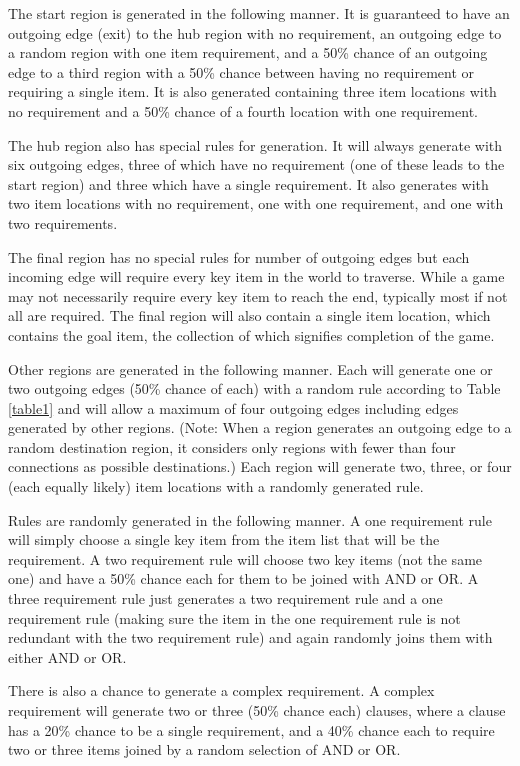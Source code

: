 \documentclass{ieeeaccess}
\begin{document}
The start region is generated in the following manner. It is guaranteed to have an outgoing
edge (exit) to the hub region with no requirement, an outgoing edge to a random region with one
item requirement, and a 50\% chance of an outgoing edge to a third region with a 50\% chance
between having no requirement or requiring a single item. It is also generated containing three
item locations with no requirement and a 50\% chance of a fourth location with one requirement.

The hub region also has special rules for generation. It will always generate with six outgoing
edges, three of which have no requirement (one of these leads to the start region) and three
which have a single requirement. It also generates with two item locations with no requirement,
one with one requirement, and one with two requirements.

The final region has no special rules for number of outgoing edges but each incoming edge will
require every key item in the world to traverse. While a game may not necessarily require every
key item to reach the end, typically most if not all are required. The final region will also
contain a single item location, which contains the goal item, the collection of which signifies
completion of the game.

Other regions are generated in the following manner. Each will generate one or two outgoing
edges (50\% chance of each) with a random rule according to Table \ref{table1} and will allow a
maximum of four outgoing edges including edges generated by other regions.
(Note:  When a region generates an outgoing edge to a random destination region, it considers
only regions with fewer than four connections as possible destinations.)
Each region will generate two, three, or four (each equally likely) item locations with a
randomly generated rule.

Rules are randomly generated in the following manner. A one requirement rule will simply choose
a single key item from the item list that will be the requirement. A two requirement rule will
choose two key items (not the same one) and have a 50\% chance each for them to be joined with
AND or OR. A three requirement rule just generates a two requirement rule and a one requirement
rule (making sure the item in the one requirement rule is not redundant with the two
requirement rule) and again randomly joins them with either AND or OR.

There is also a chance to generate a complex requirement. A complex requirement will generate
two or three (50\% chance each) clauses, where a clause has a 20\% chance to be a single
requirement, and a 40\% chance each to require two or three items joined by a random selection
of AND or OR.
\end{document}

